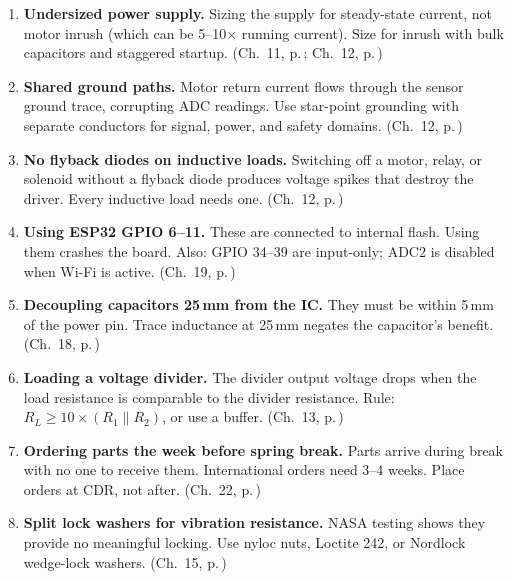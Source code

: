 \documentclass[11pt,letterpaper,twoside,openany]{book}
\begin{document}
\begin{enumerate}[leftmargin=1.5em,resume]

\item \textbf{Undersized power supply.} Sizing the supply for steady-state current, not motor inrush (which can be 5--10$\times$ running current). Size for inrush with bulk capacitors and staggered startup. (Ch.~11, p.\,\pageref{ch:motors}; Ch.~12, p.\,\pageref{ch:power})

\item \textbf{Shared ground paths.} Motor return current flows through the sensor ground trace, corrupting ADC readings. Use star-point grounding with separate conductors for signal, power, and safety domains. (Ch.~12, p.\,\pageref{ch:power})

\item \textbf{No flyback diodes on inductive loads.} Switching off a motor, relay, or solenoid without a flyback diode produces voltage spikes that destroy the driver. Every inductive load needs one. (Ch.~12, p.\,\pageref{ch:power})

\item \textbf{Using ESP32 GPIO 6--11.} These are connected to internal flash. Using them crashes the board. Also: GPIO 34--39 are input-only; ADC2 is disabled when Wi-Fi is active. (Ch.~19, p.\,\pageref{ch:mcu})

\item \textbf{Decoupling capacitors 25\,mm from the IC.} They must be within 5\,mm of the power pin. Trace inductance at 25\,mm negates the capacitor's benefit. (Ch.~18, p.\,\pageref{ch:pcb})

\item \textbf{Loading a voltage divider.} The divider output voltage drops when the load resistance is comparable to the divider resistance. Rule: $R_L \geq 10 \times (R_1 \| R_2)$, or use a buffer. (Ch.~13, p.\,\pageref{ch:electronics})

\item \textbf{Ordering parts the week before spring break.} Parts arrive during break with no one to receive them. International orders need 3--4 weeks. Place orders at CDR, not after. (Ch.~22, p.\,\pageref{ch:cdr})

\item \textbf{Split lock washers for vibration resistance.} NASA testing shows they provide no meaningful locking. Use nyloc nuts, Loctite 242, or Nordlock wedge-lock washers. (Ch.~15, p.\,\pageref{ch:fasteners})

\end{enumerate}
\end{document}
